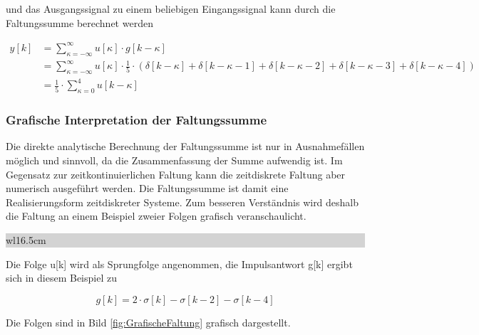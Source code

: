 \noindent und das Ausgangssignal zu einem beliebigen Eingangssignal kann durch die Faltungssumme berechnet werden 

\begin{equation}\label{eq:foureightynine}
\begin{split}
y\left[k\right] & = \sum _{\kappa =-\infty }^{\infty }u\left[\kappa \right]\cdot g\left[k-\kappa \right]\\
& = \sum _{\kappa =-\infty }^{\infty }u\left[\kappa \right]\cdot \frac{1}{5}\cdot  \left(\delta \left[k - \kappa \right]+\delta \left[k- \kappa-1\right]+\delta \left[k-\kappa-2\right]+\delta \left[k-\kappa-3\right]+\delta \left[k-\kappa-4\right]\right)\\
& = \frac{1}{5}\cdot \sum _{\kappa = 0 }^{4}u[k-\kappa]
\end{split}
\end{equation}

\clearpage

\subsubsection{Grafische Interpretation der Faltungssumme}

\noindent Die direkte analytische Berechnung der Faltungssumme ist nur in Ausnahmef\"{a}llen m\"{o}glich und sinnvoll, da die Zusammenfassung der Summe aufwendig ist. Im Gegensatz zur zeitkontinuierlichen Faltung kann die zeitdiskrete Faltung aber numerisch ausgef\"{u}hrt werden. Die Faltungssumme ist damit eine Realisierungsform zeitdiskreter Systeme. Zum besseren Verst\"{a}ndnis wird deshalb die Faltung an einem Beispiel zweier Folgen grafisch veranschaulicht.\bigskip

\noindent
\colorbox{lightgray}{%
%
\renewcommand\arraystretch{0.6}%
\begin{tabular}{ wl{16.5cm} }
{\selectfont{Beispiel: Grafische Interpretation der Faltungssumme}}
\end{tabular}%
}\medskip

\noindent Die Folge u[k] wird als Sprungfolge angenommen, die Impulsantwort g[k] ergibt sich in diesem Beispiel zu

\begin{equation}\label{eq:fourninety}
g\left[k\right]=2\cdot \sigma \left[k\right]-\sigma \left[k-2\right]-\sigma \left[k-4\right]
\end{equation}

\noindent Die Folgen sind in Bild \ref{fig:GrafischeFaltung} grafisch dargestellt.

